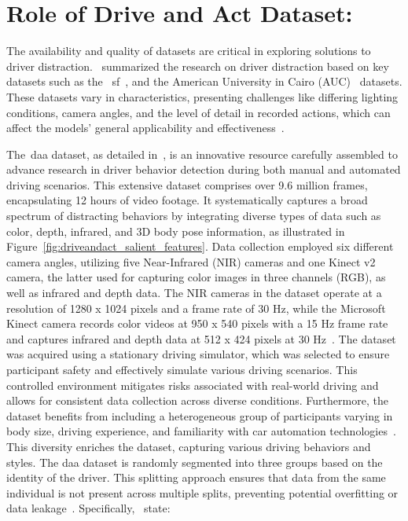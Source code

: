 \section{Role of Drive and Act Dataset:}
The availability and quality of datasets are critical in exploring solutions to driver distraction.~\citet{moslemi2021computer} summarized the research on driver distraction based on key datasets such as the ~\gls{sf}~\citep{statefarm2016}, and the American University in Cairo (AUC)~\citep{AUC_D3_dataset_abouelnaga2017real} datasets. These datasets vary in characteristics, presenting challenges like differing lighting conditions, camera angles, and the level of detail in recorded actions, which can affect the models' general applicability and effectiveness~\citep{moslemi2021computer}.

The~\gls{daa} dataset, as detailed in~\citep{martin2019drive_and_act_2019_iccv}, is an innovative resource carefully assembled to advance research in driver behavior detection during both manual and automated driving scenarios. This extensive dataset comprises over 9.6 million frames, encapsulating 12 hours of video footage. It systematically captures a broad spectrum of distracting behaviors by integrating diverse types of data such as color, depth, infrared, and 3D body pose information, as illustrated in Figure~\ref{fig:driveandact_salient_features}. Data collection employed six different camera angles, utilizing five Near-Infrared (NIR) cameras and one Kinect v2 camera, the latter used for capturing color images in three channels (RGB), as well as infrared and depth data. The NIR cameras in the dataset operate at a resolution of 1280 x 1024 pixels and a frame rate of 30 Hz, while the Microsoft Kinect camera records color videos at 950 x 540 pixels with a 15 Hz frame rate and captures infrared and depth data at 512 x 424 pixels at 30 Hz~\citep{martin2019drive_and_act_2019_iccv}. The dataset was acquired using a stationary driving simulator, which was selected to ensure participant safety and effectively simulate various driving scenarios. This controlled environment mitigates risks associated with real-world driving and allows for consistent data collection across diverse conditions. Furthermore, the dataset benefits from including a heterogeneous group of participants varying in body size, driving experience, and familiarity with car automation technologies~\citep{martin2019drive_and_act_2019_iccv}. This diversity enriches the dataset, capturing various driving behaviors and styles. The \gls{daa} dataset is randomly segmented into three groups based on the identity of the driver. This splitting approach ensures that data from the same individual is not present across multiple splits, preventing potential overfitting or data leakage~\citet{martin2019drive_and_act_2019_iccv}. Specifically,~\citet{martin2019drive_and_act_2019_iccv} state:

